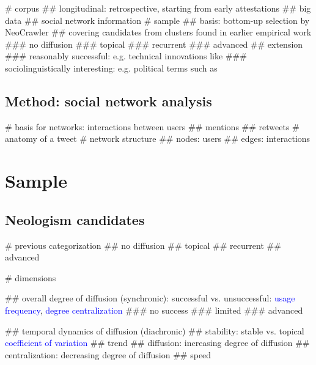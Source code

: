 \documentclass[
  a4paper,
  ]{scrartcl}
\newcommand{\mtrc}[1]{\textcolor{blue}{#1}}
\begin{document}
    \begin{easylist}[itemize]
      # corpus
        ## longitudinal: retrospective, starting from early attestations
        ## big data
        ## social network information
      # sample
        ## basis: bottom-up selection by NeoCrawler \parencite{Kerremans2018}
        ## covering candidates from clusters found in earlier empirical work \parencite{Kerremans2015}
          ### no diffusion
          ### topical
          ### recurrent
          ### advanced
        ## extension
          ### reasonably successful: e.g. technical innovations like 
          ### sociolinguistically interesting: e.g. political terms such as 
    \end{easylist}

  \subsection{Method: social network analysis}

    \begin{easylist}[itemize]
      # basis for networks: interactions between users
        ## mentions
        ## retweets
      # anatomy of a tweet
      # network structure
        ## nodes: users
        ## edges: interactions
    \end{easylist}

\section{Sample}

  \subsection{Neologism candidates}

    \begin{easylist}[itemize]

      # previous categorization \parencite{Kerremans2015}
        ## no diffusion
        ## topical
        ## recurrent
        ## advanced

      # dimensions

        ## overall degree of diffusion (synchronic): successful vs. unsuccessful: \mtrc{usage frequency}, \mtrc{degree centralization}
          ### no success
          ### limited
          ### advanced

        ## temporal dynamics of diffusion (diachronic)
          ## stability: stable vs. topical \mtrc{coefficient of variation}
          ## trend
            ## diffusion: increasing degree of diffusion
            ## centralization: decreasing degree of diffusion
          ## speed

    \end{easylist}
\end{document}
